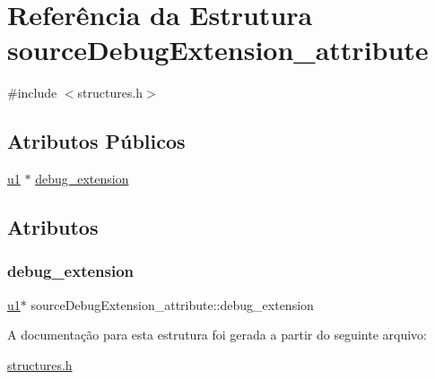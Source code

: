 \hypertarget{structsourceDebugExtension__attribute}{}\section{Referência da Estrutura source\+Debug\+Extension\+\_\+attribute}
\label{structsourceDebugExtension__attribute}


{\ttfamily \#include $<$structures.\+h$>$}

\subsection*{Atributos Públicos}
\begin{DoxyCompactItemize}
\item 
\hyperlink{lista__operandos_8h_ad9f4cdb6757615aae2fad89dab3c5470}{u1} $\ast$ \hyperlink{structsourceDebugExtension__attribute_a55b08753a7cc09bf7ca9e4b526445d7f}{debug\+\_\+extension}
\end{DoxyCompactItemize}


\subsection{Atributos}
\mbox{\label{structsourceDebugExtension__attribute_a55b08753a7cc09bf7ca9e4b526445d7f}} 
\subsubsection{\texorpdfstring{debug\+\_\+extension}{debug\_extension}}
{\footnotesize\ttfamily \hyperlink{lista__operandos_8h_ad9f4cdb6757615aae2fad89dab3c5470}{u1}$\ast$ source\+Debug\+Extension\+\_\+attribute\+::debug\+\_\+extension}



A documentação para esta estrutura foi gerada a partir do seguinte arquivo\+:\begin{DoxyCompactItemize}
\item 
\hyperlink{structures_8h}{structures.\+h}\end{DoxyCompactItemize}
